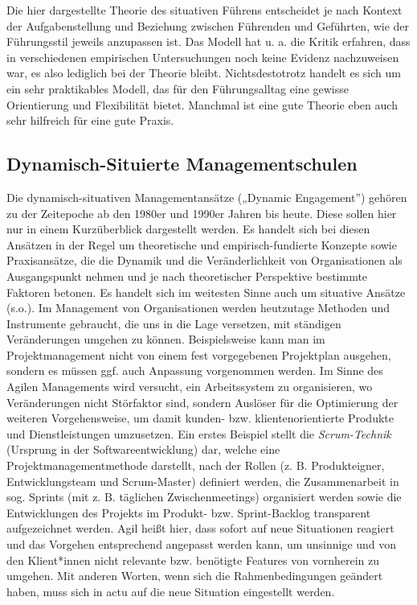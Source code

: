 \documentclass[
  letterpaper,
]{book}
\begin{document}
Die hier dargestellte Theorie des situativen Führens entscheidet je nach
Kontext der Aufgabenstellung und Beziehung zwischen Führenden und
Geführten, wie der Führungsstil jeweils anzupassen ist. Das Modell hat
u. a. die Kritik erfahren, dass in verschiedenen empirischen
Untersuchungen noch keine Evidenz nachzuweisen war, es also lediglich
bei der Theorie bleibt. Nichtsdestotrotz handelt es sich um ein sehr
praktikables Modell, das für den Führungsalltag eine gewisse
Orientierung und Flexibilität bietet. Manchmal ist eine gute Theorie
eben auch sehr hilfreich für eine gute Praxis.

\subsection{Dynamisch-Situierte
Managementschulen}\label{dynamisch-situierte-managementschulen}

Die dynamisch-situativen Managementansätze („Dynamic Engagement'')
gehören zu der Zeitepoche ab den 1980er und 1990er Jahren bis heute.
Diese sollen hier nur in einem Kurzüberblick dargestellt werden. Es
handelt sich bei diesen Ansätzen in der Regel um theoretische und
empirisch-fundierte Konzepte sowie Praxisansätze, die die Dynamik und
die Veränderlichkeit von Organisationen als Ausgangspunkt nehmen und je
nach theoretischer Perspektive bestimmte Faktoren betonen. Es handelt
sich im weitesten Sinne auch um situative Ansätze (s.o.). Im Management
von Organisationen werden heutzutage Methoden und Instrumente gebraucht,
die uns in die Lage versetzen, mit ständigen Veränderungen umgehen zu
können. Beispielsweise kann man im Projektmanagement nicht von einem
fest vorgegebenen Projektplan ausgehen, sondern es müssen ggf. auch
Anpassung vorgenommen werden. Im Sinne des Agilen Managements wird
versucht, ein Arbeitssystem zu organisieren, wo Veränderungen nicht
Störfaktor sind, sondern Auslöser für die Optimierung der weiteren
Vorgehensweise, um damit kunden- bzw. klientenorientierte Produkte und
Dienstleistungen umzusetzen. Ein erstes Beispiel stellt die
\emph{Scrum-Technik} (Ursprung in der Softwareentwicklung) dar, welche
eine Projektmanagementmethode darstellt, nach der Rollen (z. B.
Produkteigner, Entwicklungsteam und Scrum-Master) definiert werden, die
Zusammenarbeit in sog. Sprints (mit z. B. täglichen Zwischenmeetings)
organisiert werden sowie die Entwicklungen des Projekts im Produkt- bzw.
Sprint-Backlog transparent aufgezeichnet werden. Agil heißt hier, dass
sofort auf neue Situationen reagiert und das Vorgehen entsprechend
angepasst werden kann, um unsinnige und von den Klient*innen nicht
relevante bzw. benötigte Features von vornherein zu umgehen. Mit anderen
Worten, wenn sich die Rahmenbedingungen geändert haben, muss sich in
actu auf die neue Situation eingestellt werden.
\end{document}
